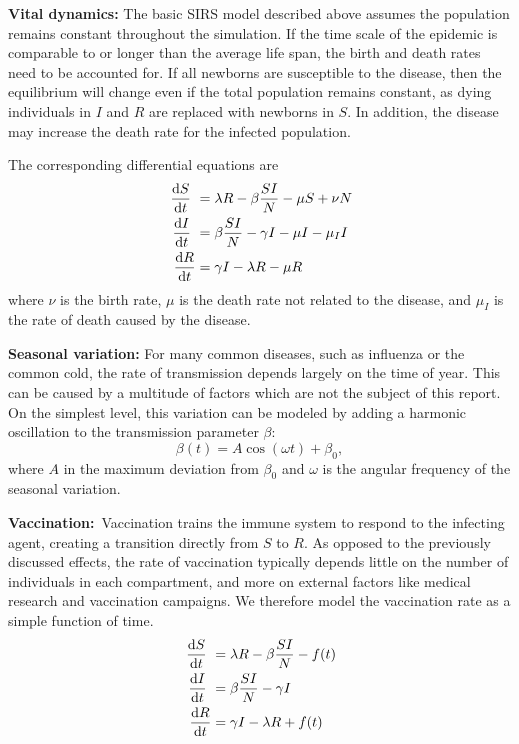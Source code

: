 \documentclass[a4paper,10pt,twocolumn]{article}
\begin{document}
\textbf{Vital dynamics:}
The basic SIRS model described above assumes the population remains constant throughout the simulation. If the time scale of the epidemic is comparable to or longer than the average life span, the birth and death rates need to be accounted for. 
If all newborns are susceptible to the disease, then the equilibrium will change even if the total population remains constant, as dying individuals in $I$ and $R$ are replaced with newborns in $S$. 
In addition, the disease may increase the death rate for the infected population. 

The corresponding differential equations are
\begin{subequations}
\begin{align}
\dv{S}{t} &= \lambda R - \beta\frac{SI}{N} - \mu S + \nu N
\\ \dv{I}{t} &= \beta\frac{SI}{N} - \gamma I - \mu I - \mu_I I
\\ \dv{R}{t} &= \gamma I - \lambda R - \mu R
\end{align}
\end{subequations}
where $\nu$ is the birth rate, $\mu$ is the death rate not related to the disease, and $\mu_I$ is the rate of death caused by the disease. 


\textbf{Seasonal variation:} For many common diseases, such as influenza or the common cold, the rate of transmission depends largely on the time of year. This can be caused by a multitude of factors which are not the subject of this report. 
On the simplest level, this variation can be modeled by adding a harmonic oscillation to the transmission parameter $\beta$:
\begin{equation}\label{eq:seasvar}
\beta(t) = A\cos(\omega t) + \beta_0,
\end{equation} 
where $A$ in the maximum deviation from $\beta_0$ and $\omega$ is the angular frequency of the seasonal variation.


\textbf{Vaccination:} Vaccination trains the immune system to respond to the infecting agent, creating a transition directly from $S$ to $R$.  As opposed to the previously discussed effects, the rate of vaccination typically depends little on the number of individuals in each compartment, and more on external factors like medical research and vaccination campaigns. 
We therefore model the vaccination rate as a simple function of time. 
\begin{subequations}
\begin{align}
\dv{S}{t} &= \lambda R - \beta\frac{SI}{N} - f(t)
\\ \dv{I}{t} &= \beta\frac{SI}{N} - \gamma I 
\\ \dv{R}{t} &= \gamma I - \lambda R + f(t)
\end{align}
\end{subequations}
\end{document}
